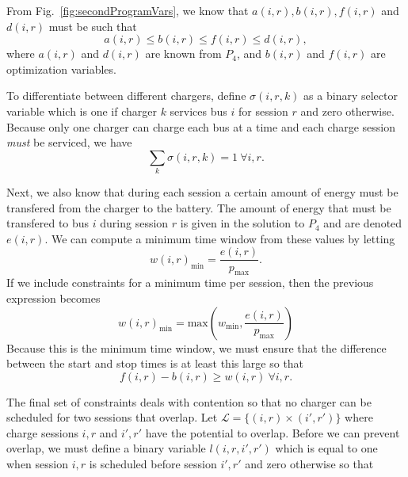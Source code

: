 From Fig.~\ref{fig:secondProgramVars}, we know that $a(i,r), b(i,r),f(i,r)$ and $d(i,r)$ must be such that 
\begin{equation}\label{eqn:assignment:eqn1}
	a(i,r) \leq b(i,r) \leq f(i,r) \leq d(i,r),
\end{equation}
where $a(i,r)$ and $d(i,r)$ are known from $P_4$, and $b(i,r)$ and $f(i,r)$ are optimization variables. 
\par To differentiate between different chargers, define $\sigma(i,r,k)$ as a binary selector variable which is one if charger $k$ services bus $i$ for session $r$ and zero otherwise. Because only one charger can charge each bus at a time and each charge session {\it must} be serviced, we have
\begin{equation}\label{eqn:assignment:eqn2}
	\sum_k \sigma(i,r,k) = 1  \ \forall i,r.
\end{equation}
\par Next, we also know that during each session a certain amount of energy must be transfered from the charger to the battery.  The amount of energy that must be transfered to bus $i$ during session $r$ is given in the solution to $P_4$ and are denoted $e(i,r)$. We can compute a minimum time window from these values by letting 
\begin{equation}\label{eqn:assignment:eqn3}
	w(i,r)_{\text{min}} = \frac{e(i,r)}{p_\text{max}}.
\end{equation}
If we include constraints for a minimum time per session, then the previous expression becomes
\begin{equation*}
	w(i,r)_{\text{min}} = \text{max}\left ( w_{\text{min}}, \frac{e(i,r)}{p_\text{max}} \right )
\end{equation*}
Because this is the minimum time window, we must ensure that the difference between the start and stop times is at least this large so that
\begin{equation}\label{eqn:assignment:eqn4}
	f(i,r) - b(i,r) \ge w(i,r) \ \forall i,r.
\end{equation}
\par The final set of constraints deals with contention so that no charger can be scheduled for two sessions that overlap. Let $\mathcal{L} = \{(i,r)\times (i',r') \}$ where charge sessions $i,r$ and $i',r'$ have the potential to overlap. Before we can prevent overlap, we must define a binary variable $l(i,r,i',r')$ which is equal to one when session $i,r$ is scheduled before session $i',r'$ and zero otherwise so that
